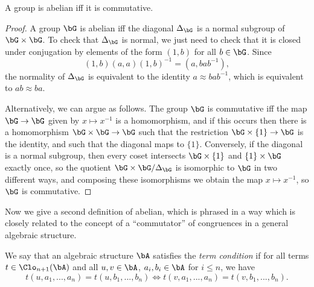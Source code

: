 \begin{prop} A group is abelian iff it is commutative.
\end{prop}
\begin{proof} A group $\bG$ is abelian iff the diagonal $\Delta_\bG$ is a normal subgroup of $\bG\times \bG$. To check that $\Delta_\bG$ is normal, we just need to check that it is closed under conjugation by elements of the form $(1,b)$ for all $b \in \bG$. Since
\[
(1,b)(a,a)(1,b)^{-1} = (a,bab^{-1}),
\]
the normality of $\Delta_\bG$ is equivalent to the identity $a \approx bab^{-1}$, which is equivalent to $ab \approx ba$.

Alternatively, we can argue as follows. The group $\bG$ is commutative iff the map $\bG \rightarrow \bG$ given by $x \mapsto x^{-1}$ is a homomorphism, and if this occurs then there is a homomorphism $\bG \times \bG \rightarrow \bG$ such that the restriction $\bG\times \{1\} \rightarrow \bG$ is the identity, and such that the diagonal maps to $\{1\}$. Conversely, if the diagonal is a normal subgroup, then every coset intersects $\bG\times \{1\}$ and $\{1\}\times \bG$ exactly once, so the quotient $\bG\times \bG/\Delta_\bG$ is isomorphic to $\bG$ in two different ways, and composing these isomorphisms we obtain the map $x \mapsto x^{-1}$, so $\bG$ is commutative.
\end{proof}

Now we give a second definition of abelian, which is phrased in a way which is closely related to the concept of a ``commutator'' of congruences in a general algebraic structure.

\begin{defn} We say that an algebraic structure $\bA$ satisfies the \emph{term condition} if for all terms $t \in \Clo_{n+1}(\bA)$ and all $u,v \in \bA$, $a_i,b_i \in \bA$ for $i \le n$, we have
\[
t(u,a_1, ..., a_n) = t(u,b_1, ..., b_n) \iff t(v,a_1, ..., a_n) = t(v,b_1, ..., b_n).
\]
\end{defn}


